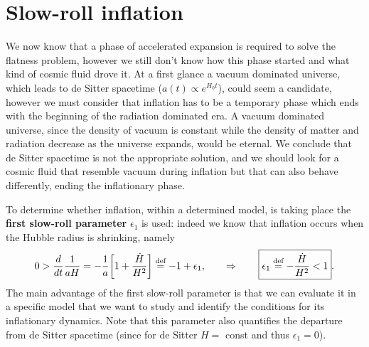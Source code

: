 \section{Slow-roll inflation}
We now know that a phase of accelerated expansion is required to solve the flatness problem, however we still don't know how this phase started and what kind of cosmic fluid drove it. At a first glance a vacuum dominated universe, which leads to de Sitter spacetime ($a(t)\propto e^{H_0t}$), could seem a candidate, however we must consider that inflation has to be a temporary phase which ends with the beginning of the radiation dominated era. A vacuum dominated universe, since the density of vacuum is constant while the density of matter and radiation decrease as the universe expands, would be eternal. We conclude that de Sitter spacetime is not the appropriate solution, and we should look for a cosmic fluid that resemble vacuum during inflation but that can also behave differently, ending the inflationary phase.

To determine whether inflation, within a determined model, is taking place the \textbf{first slow-roll parameter} $\epsilon_1$ is used: indeed we know that inflation occurs when the Hubble radius is shrinking, namely
\begin{equation}
    \label{eq:First_SR_paramteter}
    0>\frac{d}{dt}\frac{1}{aH}=-\frac{1}{a}\bigg[1+\frac{\dot H}{H^2}\bigg]\stackrel{\text{def}}{=}-1+\epsilon_1,\qquad\Rightarrow\qquad\boxed{\epsilon_1\stackrel{\text{def}}{=}-\frac{\dot H}{H^2}<1}.
\end{equation}
The main advantage of the first slow-roll parameter is that we can evaluate it in a specific model that we want to study and identify the conditions for its inflationary dynamics. Note that this parameter also quantifies the departure from de Sitter spacetime (since for de Sitter $H=$ const and thus $\epsilon_1=0$).

